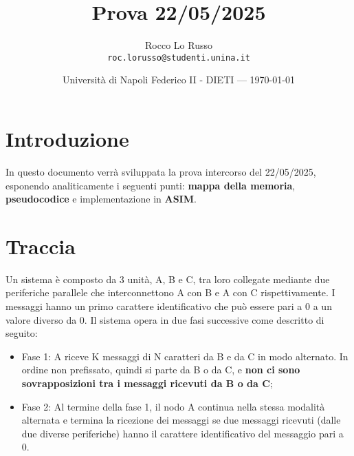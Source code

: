 \documentclass{article}
\title{Prova 22/05/2025} %
\author{Rocco Lo Russo\\ \texttt{roc.lorusso@studenti.unina.it}} %
\date{Università di Napoli Federico II - DIETI --- \today} %
\begin{document}
\maketitle %


\section*{Introduzione} %
In questo documento verrà sviluppata la prova intercorso del 22/05/2025, esponendo analiticamente i seguenti punti: \textbf{mappa della memoria}, \textbf{pseudocodice} e implementazione in \textbf{ASIM}.





\section{Traccia} \label{sec:traccia}%

Un sistema è composto da 3 unità, A, B e C, tra loro collegate mediante due periferiche parallele che interconnettono A con B e A con C rispettivamente. I messaggi hanno un primo carattere identificativo che può essere pari a 0 a un valore diverso da 0. Il sistema opera in due fasi successive come descritto di seguito:
\begin{itemize}
	\item Fase 1: A riceve K messaggi di N caratteri da B e da C in modo alternato. In ordine non prefissato, quindi si parte da B o da C, e \textbf{non ci sono sovrapposizioni tra i messaggi ricevuti da B o da C};
	\item Fase 2: Al termine della fase 1, il nodo A continua nella stessa modalità alternata e termina la ricezione dei messaggi se due messaggi ricevuti (dalle due diverse periferiche) hanno il carattere identificativo del messaggio pari a 0.
\end{itemize}
\end{document}
